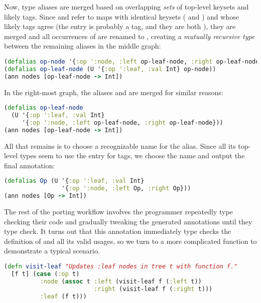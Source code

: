 Now, type aliases are merged based on overlapping \emph{sets} of top-level keysets and likely tags.
Since  and  refer to maps with identical keysets
( and ) and whose likely tags agree (the  entry
is probably a tag, and they are both ),
they are merged and all occurrences of 
are renamed to , creating a \emph{mutually recursive type}
between the remaining aliases in the middle graph:

\begin{lstlisting}[language=Clojure]
(defalias op-node '{:op ':node, :left op-leaf-node, :right op-leaf-node})
(defalias op-leaf-node (U '{:op ':leaf, :val Int} op-node))
(ann nodes [op-leaf-node -> Int])
\end{lstlisting}

In the right-most graph, the aliases  and  are merged for similar reasons:

\begin{lstlisting}[language=Clojure]
(defalias op-leaf-node
  (U '{:op ':leaf, :val Int}
     '{:op ':node, :left op-leaf-node, :right op-leaf-node}))
(ann nodes [op-leaf-node -> Int])
\end{lstlisting}

All that remains is to choose a recognizable name for the alias.
Since all its top-level types seem to use the  entry for
tags, we choose the name  and output the final annotation:

\begin{lstlisting}[language=Clojure]
(defalias Op (U '{:op ':leaf, :val Int}
                '{:op ':node, :left Op, :right Op}))
(ann nodes [Op -> Int])
\end{lstlisting}

The rest of the porting workflow involves the programmer repeatedly type checking
their code and gradually tweaking the generated annotations until they type check.
It turns out that this annotation immediately type checks the definition of 
and all its valid usages, so we turn to a more complicated function 
to demonstrate a typical scenario.

\begin{lstlisting}[language=Clojure]
(defn visit-leaf "Updates :leaf nodes in tree t with function f."
  [f t] (case (:op t)
          :node (assoc t :left (visit-leaf f (:left t))
                         :right (visit-leaf f (:right t)))
          :leaf (f t)))
\end{lstlisting}

